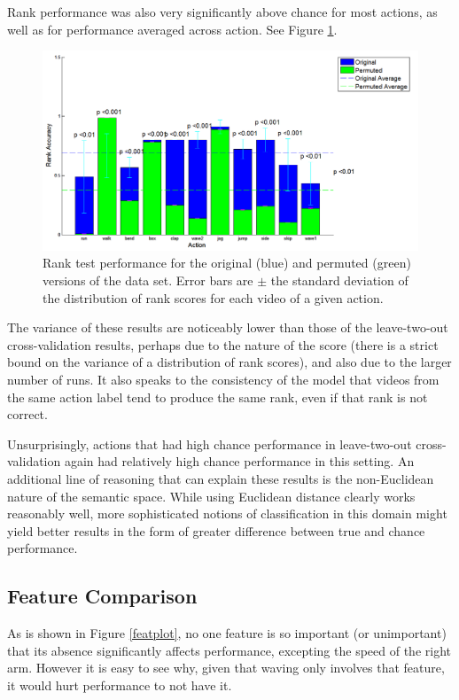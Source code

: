 \documentclass{article}
\begin{document}
Rank performance was also very significantly above chance for most actions, as well as for performance averaged across action. See Figure \ref{rankplot}.

\begin{figure}[h]
  \centering
  \includegraphics[width=.9\linewidth]{rank_snap_new}
  \caption{Rank test performance for the original (blue) and permuted (green) versions of the data set.  Error bars are $\pm$ the standard deviation of the distribution of rank scores for each video of a given action.}
  \label{rankplot}
\end{figure}

The variance of these results are noticeably lower than those of the leave-two-out cross-validation results, perhaps due to the nature of the score (there is a strict bound on the variance of a distribution of rank scores), and also due to the larger number of runs.  It also speaks to the consistency of the model that videos from the same action label tend to produce the same rank, even if that rank is not correct.

Unsurprisingly, actions that had high chance performance in leave-two-out cross-validation again had relatively high chance performance in this setting. An additional line of reasoning that can explain these results is the non-Euclidean nature of the semantic space. While using Euclidean distance clearly works reasonably well, more sophisticated notions of classification in this domain might yield better results in the form of greater difference between true and chance performance.

\subsection{Feature Comparison}

As is shown in Figure \ref{featplot}, no one feature is so important (or unimportant) that its absence significantly affects performance, excepting the speed of the right arm.  However it is easy to see why, given that waving only involves that feature, it would hurt performance to not have it.
\end{document}
